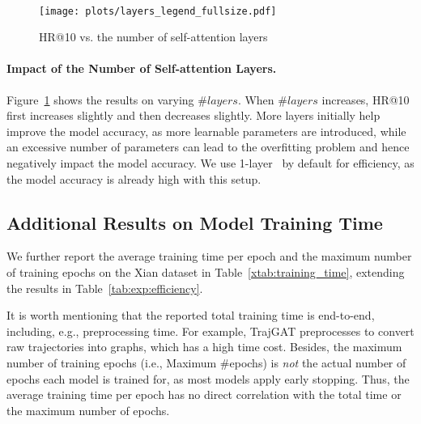 \begin{figure}[ht]
     
    \hspace*{-2mm}
     \hspace*{-2mm}
     \\ \vspace{-2mm}

    \hspace*{-2mm}
    \hspace*{5mm}
    \texttt{[image: plots/layers\_legend\_fullsize.pdf]} \\

    \caption{HR@10 vs. the number of self-attention layers}\label{fig:exp_layers}
\end{figure}

\paragraph{Impact of the Number of Self-attention Layers.} 
Figure~\ref{fig:exp_layers} shows the results on varying $\#layers$. When $\#layers$ increases, HR@10 first  increases slightly and then decreases slightly. More layers initially help improve the model accuracy, as more learnable parameters are introduced, while an excessive number of parameters can lead to the overfitting problem and hence negatively impact the model accuracy. We use 1-layer \model\ by default for efficiency, as the model accuracy is already high with this setup.



\subsection{Additional Results on Model Training Time}\label{app:training_time}
We  further report the average training time per epoch and the maximum number of training epochs on the Xian dataset in Table~\ref{xtab:training_time}, extending the results in Table~\ref{tab:exp:efficiency}. 

It is worth mentioning that the reported total training time is end-to-end, including, e.g., preprocessing time. For example, TrajGAT preprocesses to convert raw trajectories into graphs, which has a high time cost. Besides, the maximum number of training epochs (i.e., Maximum \#epochs) is \emph{not} the actual number of epochs each model is trained for, as most models apply early stopping.
Thus, the average training time per epoch has no direct correlation with the total time or the maximum number of epochs.

